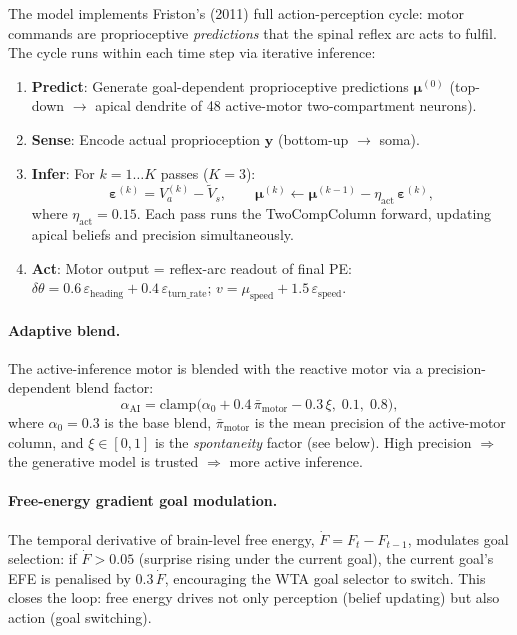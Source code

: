 \documentclass[11pt,a4paper]{article}
\begin{document}
The model implements Friston's (2011) full action-perception cycle:
motor commands are proprioceptive \emph{predictions} that the spinal
reflex arc acts to fulfil.  The cycle runs within each time step via
iterative inference:

\begin{enumerate}[nosep]
  \item \textbf{Predict}: Generate goal-dependent proprioceptive predictions
        $\boldsymbol{\mu}^{(0)}$ (top-down $\to$ apical dendrite of
        48 active-motor two-compartment neurons).
  \item \textbf{Sense}: Encode actual proprioception
        $\mathbf{y}$ (bottom-up $\to$ soma).
  \item \textbf{Infer}: For $k = 1 \ldots K$ passes ($K=3$):
        \begin{equation}\label{eq:apc_update}
          \boldsymbol{\varepsilon}^{(k)} = V_a^{(k)} - \tilde{V}_s, \qquad
          \boldsymbol{\mu}^{(k)} \leftarrow \boldsymbol{\mu}^{(k-1)}
            - \eta_\text{act}\,\boldsymbol{\varepsilon}^{(k)},
        \end{equation}
        where $\eta_\text{act}=0.15$.  Each pass runs the TwoCompColumn
        forward, updating apical beliefs and precision simultaneously.
  \item \textbf{Act}: Motor output = reflex-arc readout of final PE:
        $\delta\theta = 0.6\,\varepsilon_\text{heading}
                       + 0.4\,\varepsilon_\text{turn\_rate}$;
        $v = \mu_\text{speed} + 1.5\,\varepsilon_\text{speed}$.
\end{enumerate}

\paragraph{Adaptive blend.}
The active-inference motor is blended with the reactive motor via
a precision-dependent blend factor:
\begin{equation}\label{eq:ai_blend}
  \alpha_\text{AI} = \text{clamp}\bigl(
    \alpha_0 + 0.4\,\bar{\pi}_\text{motor} - 0.3\,\xi,\;
    0.1,\; 0.8 \bigr),
\end{equation}
where $\alpha_0=0.3$ is the base blend, $\bar{\pi}_\text{motor}$ is
the mean precision of the active-motor column, and $\xi \in [0,1]$
is the \emph{spontaneity} factor (see below).  High precision $\Rightarrow$
the generative model is trusted $\Rightarrow$ more active inference.

\paragraph{Free-energy gradient goal modulation.}
The temporal derivative of brain-level free energy,
$\dot{F} = F_t - F_{t-1}$, modulates goal selection:
if $\dot{F} > 0.05$ (surprise rising under the current goal), the
current goal's EFE is penalised by $0.3\,\dot{F}$, encouraging
the WTA goal selector to switch.  This closes the loop: free energy
drives not only perception (belief updating) but also action (goal
switching).
\end{document}
